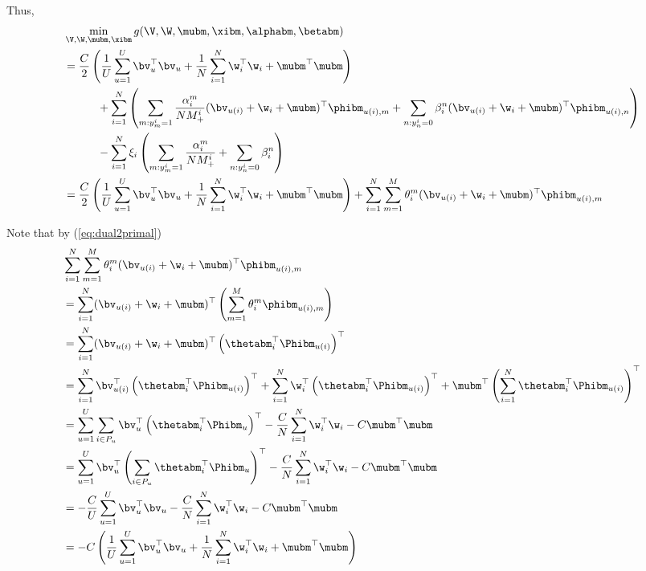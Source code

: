 Thus, 
\begin{equation*}
\begin{aligned}
&\min_{\V, \W, \mubm, \xibm} g(\V, \W, \mubm, \xibm, \alphabm, \betabm) \\
&= \frac{C}{2} \left( \frac{1}{U} \sum_{u=1}^U \bv_u^\top \bv_u 
     + \frac{1}{N} \sum_{i=1}^N \w_i^\top \w_i + \mubm^\top \mubm \right) \\
& \hspace{3em}
     + \sum_{i=1}^N \left( 
       \sum_{m: y_m^i = 1} \frac{\alpha_i^m}{N M_+^i} (\bv_{u(i)} + \w_i + \mubm)^\top \phibm_{u(i),m} 
     + \sum_{n: y_n^i = 0} \beta_i^n (\bv_{u(i)} + \w_i + \mubm)^\top \phibm_{u(i),n} \right) \\
& \hspace{3em}
     - \sum_{i=1}^N \xi_i \left( \sum_{m: y_m^i = 1} \frac{\alpha_i^m}{N M_+^i} + \sum_{n: y_n^i = 0} \beta_i^n \right) \\
&= \frac{C}{2} \left( \frac{1}{U} \sum_{u=1}^U \bv_u^\top \bv_u 
     + \frac{1}{N} \sum_{i=1}^N \w_i^\top \w_i + \mubm^\top \mubm \right)
     + \sum_{i=1}^N \sum_{m=1}^M \theta_i^m (\bv_{u(i)} + \w_i + \mubm)^\top \phibm_{u(i),m}
\end{aligned}
\end{equation*}

Note that by (\ref{eq:dual2primal})
\begin{equation*}
\begin{aligned}
&\sum_{i=1}^N \sum_{m=1}^M \theta_i^m (\bv_{u(i)} + \w_i + \mubm)^\top \phibm_{u(i),m} \\
&= \sum_{i=1}^N (\bv_{u(i)} + \w_i + \mubm)^\top \left( \sum_{m=1}^M \theta_i^m \phibm_{u(i),m} \right) \\
&= \sum_{i=1}^N (\bv_{u(i)} + \w_i + \mubm)^\top \left( \thetabm_i^\top \Phibm_{u(i)} \right)^\top \\
&= \sum_{i=1}^N \bv_{u(i)}^\top \left( \thetabm_i^\top \Phibm_{u(i)} \right)^\top 
     + \sum_{i=1}^N \w_i^\top \left( \thetabm_i^\top \Phibm_{u(i)} \right)^\top 
     + \mubm^\top \left( \sum_{i=1}^N \thetabm_i^\top \Phibm_{u(i)} \right)^\top \\
&= \sum_{u=1}^U \sum_{i \in P_u} \bv_u^\top \left( \thetabm_i^\top \Phibm_u \right)^\top
     - \frac{C}{N} \sum_{i=1}^N \w_i^\top \w_i 
     - C \mubm^\top \mubm \\
&= \sum_{u=1}^U \bv_u^\top \left( \sum_{i \in P_u} \thetabm_i^\top \Phibm_u \right)^\top
     - \frac{C}{N} \sum_{i=1}^N \w_i^\top \w_i 
     - C \mubm^\top \mubm \\
&= -\frac{C}{U} \sum_{u=1}^U \bv_u^\top \bv_u
     - \frac{C}{N} \sum_{i=1}^N \w_i^\top \w_i 
     - C \mubm^\top \mubm \\
&= -C \left( \frac{1}{U} \sum_{u=1}^U \bv_u^\top \bv_u
     + \frac{1}{N} \sum_{i=1}^N \w_i^\top \w_i 
     + \mubm^\top \mubm \right)
\end{aligned}
\end{equation*}

